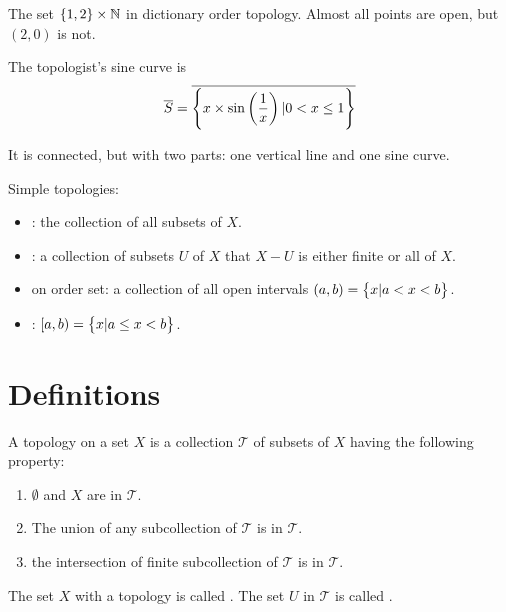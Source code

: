 \begin{definition}
    The set $\set{1,2} \times \mathbb{N}$ in dictionary order topology. Almost all points are open, but $(2,0)$ is not.
\end{definition}

\begin{definition}\label{topologist_sine_curve}
    The topologist's sine curve is
    \begin{equation}
        \overline{S} = \overline{\set{x \times \sin \left(\frac{1}{x} \right) | 0 < x \leq 1}}
    \end{equation}
    
    It is connected, but with two parts: one vertical line and one sine curve.
\end{definition}


\begin{example}
    Simple topologies:
\begin{itemize}
    \item {}: the collection of all subsets of $X$.
    \item {}: a collection of subsets $U$ of $X$ that $X - U$ is either finite or all of $X$.
    \item {} on order set: a collection of all open intervals $(a,b) = \set{x | a < x < b}$.
    \item {} : $[a,b) = \set{x | a \leq x < b}$.
\end{itemize}
\end{example}




\section{Definitions}

\begin{definition}
    A topology on a set $X$ is a collection $\mathcal{T}$ of subsets of $X$ having the following property:
    \begin{enumerate}
        \item $\emptyset$ and $X$ are in $\mathcal{T}$.
        \item The union of any subcollection of $\mathcal{T}$ is in $\mathcal{T}$.
        \item the intersection of finite subcollection of $\mathcal{T}$ is in $\mathcal{T}$.
    \end{enumerate}

The set $X$ with a topology is called . The set $U$ in $\mathcal{T}$ is called .
\end{definition}

